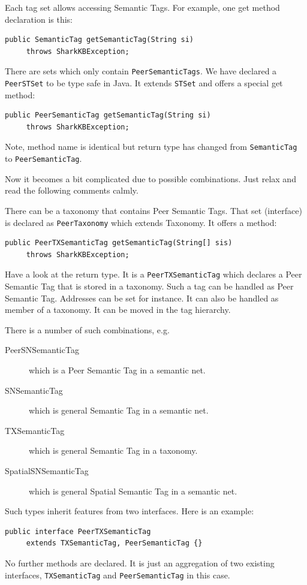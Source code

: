 Each tag set allows accessing Semantic Tags. For example, one get method declaration is this:

\begin{verbatim}
public SemanticTag getSemanticTag(String si)
     throws SharkKBException;
\end{verbatim}

There are sets which only contain {\tt PeerSemanticTags}. We have declared a {\tt PeerSTSet} to be type safe in Java. It extends {\tt STSet} and offers a special get method:

\begin{verbatim}
public PeerSemanticTag getSemanticTag(String si)
     throws SharkKBException;
\end{verbatim}

Note, method name is identical but return type has changed from {\tt SemanticTag} to {\tt PeerSemanticTag}.

Now it becomes a bit complicated due to possible combinations. Just relax and read the following comments calmly.

There can be a taxonomy that contains Peer Semantic Tags. That set (interface) is declared as {\tt PeerTaxonomy} which extends Taxonomy. It offers a method:

\begin{verbatim}
public PeerTXSemanticTag getSemanticTag(String[] sis)
     throws SharkKBException;
\end{verbatim}

Have a look at the return type. It is a {\tt PeerTXSemanticTag} which declares a Peer Semantic Tag that is stored in a taxonomy. Such a tag can be handled as Peer Semantic Tag. Addresses can be set for instance. It can also be handled as member of a taxonomy. It can be moved in the tag hierarchy.

There is a number of such combinations, e.g.

\begin{description}
\item[PeerSNSemanticTag] which is a Peer Semantic Tag in a semantic net.
\item[SNSemanticTag] which is general Semantic Tag in a semantic net.
\item[TXSemanticTag] which is general Semantic Tag in a taxonomy.
\item[SpatialSNSemanticTag] which is general Spatial Semantic Tag in a semantic net.
\end{description}

Such types inherit features from two interfaces. Here is an example:
\begin{verbatim}
public interface PeerTXSemanticTag
     extends TXSemanticTag, PeerSemanticTag {}
\end{verbatim}
No further methods are declared. It is just an aggregation of two existing interfaces, {\tt TXSemanticTag} and {\tt PeerSemanticTag} in this case.


